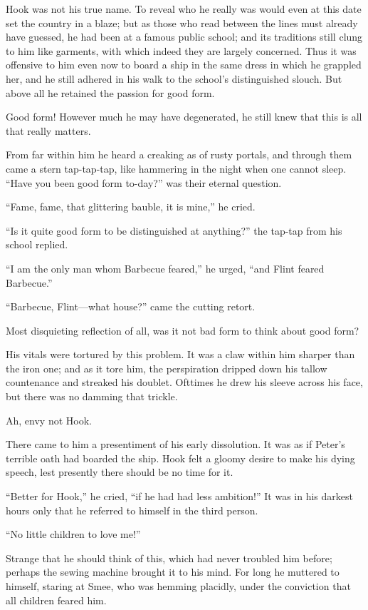 Hook was not his true name.
To reveal who he really was would even at this date set the country in a blaze;
but as those who read between the lines must already have guessed, he had been at a famous public school;
and its traditions still clung to him like garments,
with which indeed they are largely concerned.
Thus it was offensive to him even now to board a ship in the same dress in which he grappled her,
and he still adhered in his walk to the school’s distinguished slouch.
But above all he retained the passion for good form.

Good form!
However much he may have degenerated, he still knew that this is all that really matters.

From far within him he heard a creaking as of rusty portals,
and through them came a stern tap-tap-tap, like hammering in the night when one cannot sleep.
“Have you been good form to-day?\@” was their eternal question.

“Fame, fame, that glittering bauble, it is mine,” he cried.

“Is it quite good form to be distinguished at anything?\@” the tap-tap from his school replied.

“I am the only man whom Barbecue feared,” he urged, “and Flint feared Barbecue.”

“Barbecue, Flint—what house?\@” came the cutting retort.

Most disquieting reflection of all, was it not bad form to think about good form?

His vitals were tortured by this problem.
It was a claw within him sharper than the iron one;
and as it tore him, the perspiration dripped down his tallow countenance and streaked his doublet.
Ofttimes he drew his sleeve across his face, but there was no damming that trickle.

Ah, envy not Hook.

There came to him a presentiment of his early dissolution.
It was as if Peter’s terrible oath had boarded the ship.
Hook felt a gloomy desire to make his dying speech,
lest presently there should be no time for it.

“Better for Hook,” he cried, “if he had had less ambition!”
It was in his darkest hours only that he referred to himself in the third person.

“No little children to love me!”

Strange that he should think of this, which had never troubled him before;
perhaps the sewing machine brought it to his mind.
For long he muttered to himself, staring at Smee, who was hemming placidly,
under the conviction that all children feared him.

